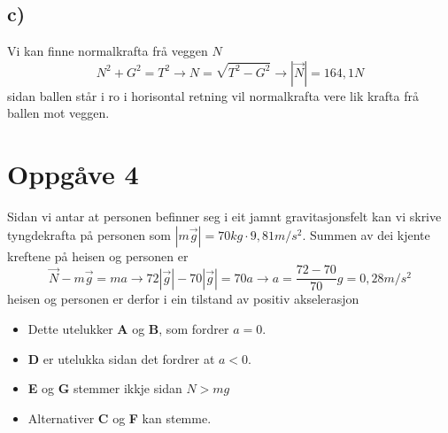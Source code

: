 \documentclass[12pt,a4paper]{article}
\begin{document}
    \subsection*{c)}
    Vi kan finne normalkrafta frå veggen $N$
    \begin{equation}
      N^2 + G^2 = T^2 \rightarrow N = \sqrt{T^2 - G^2}
      \rightarrow |\vec{N}| = 164,1N
    \end{equation}
    sidan ballen står i ro i horisontal retning vil normalkrafta vere lik krafta
    frå ballen mot veggen.

  \section*{Oppgåve 4}
    Sidan vi antar at personen befinner seg i eit jamnt gravitasjonsfelt kan vi skrive
    tyngdekrafta på personen som $|m\vec{g}| = 70kg\cdot9,81m/s^2$. Summen av dei kjente 
    kreftene på heisen og personen er
    \begin{equation}
      \vec{N} - m\vec{g} = ma \rightarrow 72|\vec{g}| - 70|\vec{g}| = 70a
      \rightarrow a = \frac{72-70}{70}g = 0,28m/s^2
    \end{equation}
    heisen og personen er derfor i ein tilstand av positiv akselerasjon
    \begin{itemize}
      \item Dette utelukker \textbf{A} og \textbf{B}, som fordrer $a=0$.
      \item \textbf{D} er utelukka sidan det fordrer at $a<0$.
      \item \textbf{E} og \textbf{G} stemmer ikkje sidan $N>mg$
      \item Alternativer \textbf{C} og \textbf{F} kan stemme.
    \end{itemize}
\end{document}
